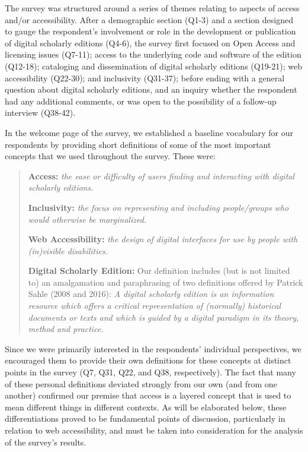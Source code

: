 \begin{paper}
The survey was structured around a series of themes relating to aspects
of access and/or accessibility. After a demographic section (Q1-3) and a
section designed to gauge the respondent's involvement or role in the
development or publication of digital scholarly editions (Q4-6), the
survey first focused on Open Access and licensing issues (Q7-11); access
to the underlying code and software of the edition (Q12-18); cataloging
and dissemination of digital scholarly editions (Q19-21); web
accessibility (Q22-30); and inclusivity (Q31-37); before ending with a
general question about digital scholarly editions, and an inquiry
whether the respondent had any additional comments, or was open to the
possibility of a follow-up interview (Q38-42).

In the welcome page of the survey, we established a baseline vocabulary
for our respondents by providing short definitions of some of the most
important concepts that we used throughout the survey. These were:
\begin{quote}
\textbf{Access:} \emph{the ease or difficulty of users finding and interacting with digital scholarly editions.}\par
\textbf{Inclusivity:} \emph{the focus on
representing and including people/groups who would otherwise be
marginalized.}\par
\textbf{Web Accessibility:} \emph{the design of digital interfaces for use by people with (in)visible disabilities.}\par
\textbf{Digital Scholarly Edition:} Our
definition includes (but is not limited to) an amalgamation and
paraphrasing of two definitions offered by Patrick Sahle (2008 and
2016): \emph{A digital scholarly edition is an information resource
which offers a critical representation of (normally) historical
documents or texts and which is guided by a digital paradigm in its
theory, method and
practice.}
\end{quote}
Since we were primarily interested in the respondents' individual
perspectives, we encouraged them to provide their own definitions for
these concepts at distinct points in the survey (Q7, Q31, Q22, and Q38,
respectively). The fact that many of these personal definitions deviated
strongly from our own (and from one another) confirmed our premise that
access is a layered concept that is used to mean different things in
different contexts. As will be elaborated below, these differentiations
proved to be fundamental points of discussion, particularly in relation
to web accessibility, and must be taken into consideration for the
analysis of the survey's results.



\end{paper}
